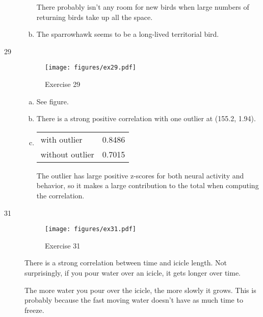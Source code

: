 \documentclass[letterpaper, landscape]{exam}
\begin{document}
\begin{description}
\begin{enumerate}[(a)]
            There probably isn't any room for new birds when large numbers of
            returning birds take up all the space.

          \item The sparrowhawk seems to be a long-lived territorial bird.

        \end{enumerate}

      \item[29]
        \begin{figure}[H]
          \centering
          \texttt{[image: figures/ex29.pdf]}
          \caption{Exercise 29}
        \end{figure}\label{fig:ex29}

        \begin{enumerate}[(a)]
          \item See figure.

          \item
            There is a strong positive correlation with one outlier at (155.2,
            1.94).

          \item
            \begin{tabular}[H]{lr}
              \toprule
              with outlier    & 0.8486 \\
              without outlier & 0.7015 \\
              \bottomrule
            \end{tabular}

            The outlier has large positive z-scores for both neural activity and
            behavior, so it makes a large contribution to the total when
            computing the correlation.

        \end{enumerate}

      \item[31]
        \begin{figure}[H]
          \centering
          \texttt{[image: figures/ex31.pdf]}
          \caption{Exercise 31}
        \end{figure}

        There is a strong correlation between time and icicle length.  Not
        surprisingly, if you pour water over an icicle, it gets longer over
        time.

        The more water you pour over the icicle, the more slowly it grows.  This
        is probably because the fast moving water doesn't have as much time to
        freeze.


\end{description}
\end{document}
